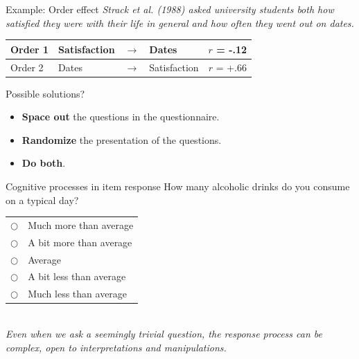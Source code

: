 \documentclass{beamer}
\begin{document}
\begin{frame}{Example: Order effect}
\textit{Strack et al. (1988) asked university students both how satisfied they were with their life in general and how often they went out on dates.} \\
\vspace{1em}
\centering
\begin{tabular}{l|lclc}
    \toprule
   Order 1 & Satisfaction & $\rightarrow$ & Dates & $r$ = -.12 \\
   \midrule
   \pause
   Order 2 & Dates & $\rightarrow$ & Satisfaction & $r$ = +.66 \\
   \bottomrule
\end{tabular}
\vspace{0.3cm}
\begin{block}{Possible solutions?}
\pause
\begin{itemize}
    \item \textbf{Space out} the questions in the questionnaire.
    \pause
    \item \textbf{Randomize} the presentation of the questions.
    \pause
    \item \textbf{Do both}.
\end{itemize}
\end{block}
\end{frame}

\begin{frame}{Cognitive processes in item response}
How many alcoholic drinks do you consume on a typical day? \\
\vspace{0.2cm}
\begin{tabular}{ll}
    $\bigcirc$ & Much more than average \\
    $\bigcirc$ & A bit more than average \\
    $\bigcirc$ & Average \\
    $\bigcirc$ & A bit less than average \\
    $\bigcirc$ & Much less than average \\
\end{tabular}
\vspace{1em}
\\ \textit{Even when we ask a seemingly trivial question, the response process can be complex, open to interpretations and manipulations.}
\end{frame}
\end{document}
